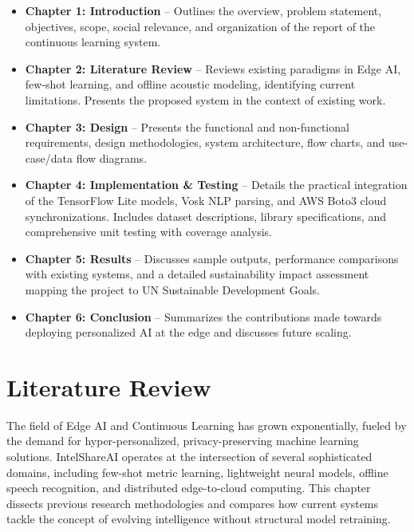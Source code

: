 \documentclass[12pt,a4paper]{report}
\begin{document}
\begin{itemize}
    \item \textbf{Chapter 1: Introduction} -- Outlines the overview, problem statement, objectives, scope, social relevance, and organization of the report of the continuous learning system.
    
    \item \textbf{Chapter 2: Literature Review} -- Reviews existing paradigms in Edge AI, few-shot learning, and offline acoustic modeling, identifying current limitations. Presents the proposed system in the context of existing work.
    
    \item \textbf{Chapter 3: Design} -- Presents the functional and non-functional requirements, design methodologies, system architecture, flow charts, and use-case/data flow diagrams.
    
    \item \textbf{Chapter 4: Implementation \& Testing} -- Details the practical integration of the TensorFlow Lite models, Vosk NLP parsing, and AWS Boto3 cloud synchronizations. Includes dataset descriptions, library specifications, and comprehensive unit testing with coverage analysis.
    
    \item \textbf{Chapter 5: Results} -- Discusses sample outputs, performance comparisons with existing systems, and a detailed sustainability impact assessment mapping the project to UN Sustainable Development Goals.
    
    \item \textbf{Chapter 6: Conclusion} -- Summarizes the contributions made towards deploying personalized AI at the edge and discusses future scaling.
\end{itemize}


\chapter{Literature Review}

The field of Edge AI and Continuous Learning has grown exponentially, fueled by the demand for hyper-personalized, privacy-preserving machine learning solutions. IntelShareAI operates at the intersection of several sophisticated domains, including few-shot metric learning, lightweight neural models, offline speech recognition, and distributed edge-to-cloud computing. This chapter dissects previous research methodologies and compares how current systems tackle the concept of evolving intelligence without structural model retraining. 
\end{document}
